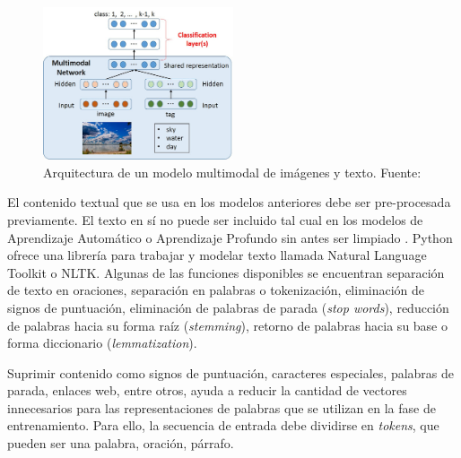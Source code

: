 \begin{itemize}
	\begin{figure}[!ht]
		\begin{center}
			\includegraphics[width=0.50\textwidth]{2/figures/multimodal_network.jpg}
			\caption{Arquitectura de un modelo multimodal de imágenes y texto. Fuente: \cite{tec_nishida2015multimodal}}
			\label{2:fig46}
		\end{center}
	\end{figure}
	
\end{itemize}

El contenido textual que se usa en los modelos anteriores debe ser pre-procesada previamente. El texto en sí no puede ser incluido tal cual en los modelos de Aprendizaje Automático o Aprendizaje Profundo sin antes ser limpiado \parencite{bk_brownlee2017deeplearning_nlp}. Python ofrece una librería para trabajar y modelar texto llamada Natural Language Toolkit o NLTK. Algunas de las funciones disponibles se encuentran separación de texto en oraciones, separación en palabras o tokenización, eliminación de signos de puntuación, eliminación de palabras de parada (\textit{stop words}), reducción de palabras hacia su forma raíz (\textit{stemming}), retorno de palabras hacia su base o forma diccionario (\textit{lemmatization}).

Suprimir contenido como signos de puntuación, caracteres especiales, palabras de parada, enlaces web, entre otros, ayuda a reducir la cantidad de vectores innecesarios para las representaciones de palabras que se utilizan en la fase de entrenamiento. Para ello, la secuencia de entrada debe dividirse en \textit{tokens}, que pueden ser una palabra, oración, párrafo.

